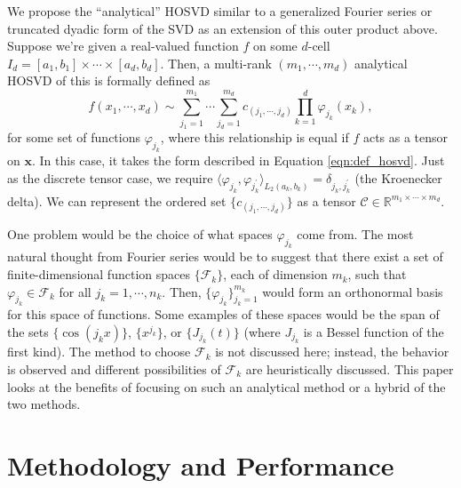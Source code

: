 \documentclass[12pt]{article}
\newcommand{\R}{\mathbb{R}}
\begin{document}
    We propose the ``analytical'' HOSVD similar to a generalized Fourier series or truncated dyadic form of the SVD as an extension of this outer product above. Suppose we're given a real-valued function $f$ on some $d$-cell $I_d = [a_1,b_1]\times\cdots\times[a_d,b_d]$. Then, a multi-rank $(m_1,\cdots,m_d)$ analytical HOSVD of this is formally defined as
    \begin{equation}\label{eqn:hosvd_form}
        f(x_1,\cdots,x_d)\sim \sum_{j_1=1}^{m_1}\cdots\sum_{j_d=1}^{m_d}c_{(j_1,\cdots,j_d)}\prod_{k=1}^d \varphi_{j_k}(x_k),
    \end{equation}
    for some set of functions $\varphi_{j_k}$, where this relationship is equal if $f$ acts as a tensor on $\mathbf{x}$. In this case, it takes the form described in Equation \ref{eqn:def_hosvd}. Just as the discrete tensor case, we require $\langle\varphi_{j_k},\varphi_{j^\prime_k}\rangle_{L_2(a_k,b_k)} = \delta_{j_k,j^\prime_k}$ (the Kroenecker delta). We can represent the ordered set $\{c_{(j_1,\cdots,j_d)}\}$ as a tensor $\mathscr{C}\in\R^{m_1\times\cdots\times m_d}$.

    One problem would be the choice of what spaces $\varphi_{j_k}$ come from. The most natural thought from Fourier series would be to suggest that there exist a set of finite-dimensional function spaces $\{\mathcal{F}_k\}$, each of dimension $m_k$, such that  $\varphi_{j_k}\in\mathcal{F}_k$ for all $j_k=1,\cdots,n_k$. Then, $\{\varphi_{j_k}\}_{j_k=1}^{m_k}$ would form an orthonormal basis for this space of functions. Some examples of these spaces would be the span of the sets $\{\cos(j_kx)\}$, $\{x^{j_k}\}$, or $\{J_{j_k}(t)\}$ (where $J_{j_k}$ is a Bessel function of the first kind). The method to choose $\mathcal{F}_k$ is not discussed here; instead, the behavior is observed and different possibilities of $\mathcal{F}_k$ are heuristically discussed. This paper looks at the benefits of focusing on such an analytical method or a hybrid of the two methods.

    \section{Methodology and Performance}
\end{document}
